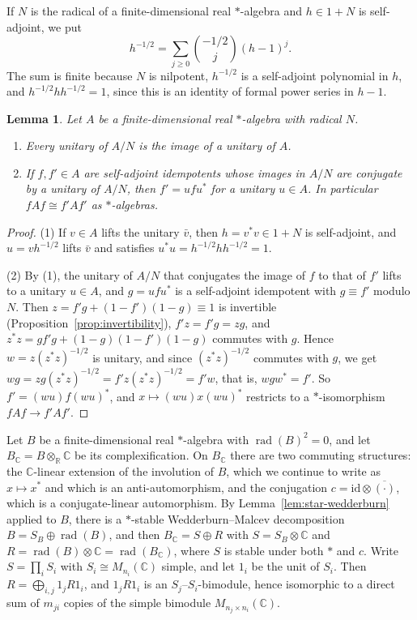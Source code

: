 \documentclass[12pt, a4paper]{report}
\theoremstyle{plain}
\newtheorem{lemma}[theorem]{Lemma}
\theoremstyle{definition}
\theoremstyle{remark}
\theoremstyle{plain}
\newcommand{\rad}[0]{\operatorname{rad}} %
\newcommand{\RR}{\mathbb{R}}
\newcommand{\CC}{\mathbb{C}}
\begin{document}
If $N$ is the radical of a finite-dimensional real $*$-algebra and $h\in1+N$ is self-adjoint, we put
\[ h^{-1/2}=\sum_{j\geq0}\binom{-1/2}{j}(h-1)^j . \]
The sum is finite because $N$ is nilpotent, $h^{-1/2}$ is a self-adjoint polynomial in $h$, and $h^{-1/2}hh^{-1/2}=1$, since this is an identity of formal power series in $h-1$.

\begin{lemma}\label{lem:unitary-lifting}
Let $A$ be a finite-dimensional real $*$-algebra with radical $N$.
\begin{enumerate}
  \item Every unitary of $A/N$ is the image of a unitary of $A$.
  \item If $f,f'\in A$ are self-adjoint idempotents whose images in $A/N$ are conjugate by a unitary of $A/N$, then $f'=ufu^*$ for a unitary $u\in A$. In particular $fAf\cong f'Af'$ as $*$-algebras.
\end{enumerate}
\end{lemma}
\begin{proof}
(1) If $v\in A$ lifts the unitary $\bar v$, then $h=v^*v\in1+N$ is self-adjoint, and $u=vh^{-1/2}$ lifts $\bar v$ and satisfies $u^*u=h^{-1/2}hh^{-1/2}=1$.

(2) By (1), the unitary of $A/N$ that conjugates the image of $f$ to that of $f'$ lifts to a unitary $u\in A$, and $g=ufu^*$ is a self-adjoint idempotent with $g\equiv f'$ modulo $N$. Then $z=f'g+(1-f')(1-g)\equiv1$ is invertible (Proposition~\ref{prop:invertibility}), $f'z=f'g=zg$, and $z^*z=gf'g+(1-g)(1-f')(1-g)$ commutes with $g$. Hence $w=z(z^*z)^{-1/2}$ is unitary, and since $(z^*z)^{-1/2}$ commutes with $g$, we get $wg=zg(z^*z)^{-1/2}=f'z(z^*z)^{-1/2}=f'w$, that is, $wgw^*=f'$. So $f'=(wu)f(wu)^*$, and $x\mapsto(wu)x(wu)^*$ restricts to a $*$-isomorphism $fAf\to f'Af'$.
\end{proof}

Let $B$ be a finite-dimensional real $*$-algebra with $\rad(B)^2=0$, and let $B_\CC=B\otimes_\RR\CC$ be its complexification. On $B_\CC$ there are two commuting structures: the $\CC$-linear extension of the involution of $B$, which we continue to write as $x\mapsto x^*$ and which is an anti-automorphism, and the conjugation $c=\mathrm{id}\otimes\overline{(\cdot)}$, which is a conjugate-linear automorphism. By Lemma~\ref{lem:star-wedderburn} applied to $B$, there is a $*$-stable Wedderburn--Malcev decomposition $B=S_B\oplus\rad(B)$, and then $B_\CC=S\oplus R$ with $S=S_B\otimes\CC$ and $R=\rad(B)\otimes\CC=\rad(B_\CC)$, where $S$ is stable under both $*$ and $c$. Write $S=\prod_iS_i$ with $S_i\cong M_{n_i}(\CC)$ simple, and let $1_i$ be the unit of $S_i$. Then $R=\bigoplus_{i,j}1_jR1_i$, and $1_jR1_i$ is an $S_j$--$S_i$-bimodule, hence isomorphic to a direct sum of $m_{ji}$ copies of the simple bimodule $M_{n_j\times n_i}(\CC)$.
\end{document}
